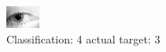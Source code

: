 \begin{figure}[h!]
\begin{center}
\includegraphics[width=0.60\columnwidth]{figures/ID1374_class_4_target_3.png}
\end{center}
\caption{ Classification: 4 actual target: 3}
\label{fig:ID1374_class_4_target_3}
\end{figure}
